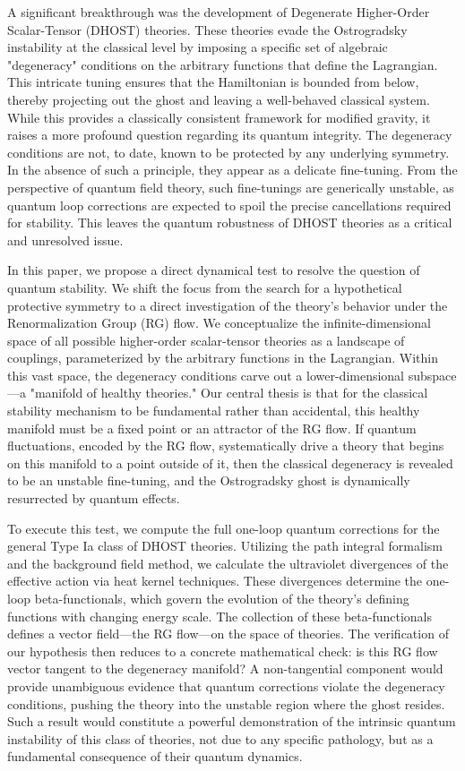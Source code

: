 \documentclass[twocolumn]{aastex631}
\begin{document}
A significant breakthrough was the development of Degenerate Higher-Order Scalar-Tensor (DHOST) theories. These theories evade the Ostrogradsky instability at the classical level by imposing a specific set of algebraic "degeneracy" conditions on the arbitrary functions that define the Lagrangian. This intricate tuning ensures that the Hamiltonian is bounded from below, thereby projecting out the ghost and leaving a well-behaved classical system. While this provides a classically consistent framework for modified gravity, it raises a more profound question regarding its quantum integrity. The degeneracy conditions are not, to date, known to be protected by any underlying symmetry. In the absence of such a principle, they appear as a delicate fine-tuning. From the perspective of quantum field theory, such fine-tunings are generically unstable, as quantum loop corrections are expected to spoil the precise cancellations required for stability. This leaves the quantum robustness of DHOST theories as a critical and unresolved issue.

In this paper, we propose a direct dynamical test to resolve the question of quantum stability. We shift the focus from the search for a hypothetical protective symmetry to a direct investigation of the theory's behavior under the Renormalization Group (RG) flow. We conceptualize the infinite-dimensional space of all possible higher-order scalar-tensor theories as a landscape of couplings, parameterized by the arbitrary functions in the Lagrangian. Within this vast space, the degeneracy conditions carve out a lower-dimensional subspace---a "manifold of healthy theories." Our central thesis is that for the classical stability mechanism to be fundamental rather than accidental, this healthy manifold must be a fixed point or an attractor of the RG flow. If quantum fluctuations, encoded by the RG flow, systematically drive a theory that begins on this manifold to a point outside of it, then the classical degeneracy is revealed to be an unstable fine-tuning, and the Ostrogradsky ghost is dynamically resurrected by quantum effects.

To execute this test, we compute the full one-loop quantum corrections for the general Type Ia class of DHOST theories. Utilizing the path integral formalism and the background field method, we calculate the ultraviolet divergences of the effective action via heat kernel techniques. These divergences determine the one-loop beta-functionals, which govern the evolution of the theory's defining functions with changing energy scale. The collection of these beta-functionals defines a vector field---the RG flow---on the space of theories. The verification of our hypothesis then reduces to a concrete mathematical check: is this RG flow vector tangent to the degeneracy manifold? A non-tangential component would provide unambiguous evidence that quantum corrections violate the degeneracy conditions, pushing the theory into the unstable region where the ghost resides. Such a result would constitute a powerful demonstration of the intrinsic quantum instability of this class of theories, not due to any specific pathology, but as a fundamental consequence of their quantum dynamics.
\end{document}
